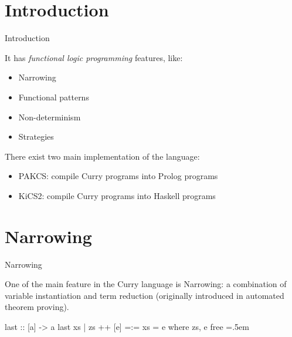 \documentclass{beamer}
\newenvironment{cverbatim}
 {\SaveVerbatim{cverb}}
 {\endSaveVerbatim
  \flushleft\fboxrule=0pt\fboxsep=.5em
  \colorbox{cverbbg}{\BUseVerbatim{cverb}}%
  \endflushleft
}
\begin{document}
\section{Introduction}
\begin{frame}{Introduction}

It has \emph{functional logic programming} features, like:

\vspace{1em}

\begin{itemize}
  \item Narrowing
  \item Functional patterns
  \item Non-determinism
  \item Strategies
\end{itemize}

\vspace{1em}

There exist two main implementation of the language:

\vspace{1em}

\begin{itemize}
  \item PAKCS: compile Curry programs into Prolog programs
  \item KiCS2: compile Curry programs into Haskell programs
\end{itemize}

\end{frame}


\section{Narrowing}
\begin{frame}[fragile]{Narrowing}

One of the main feature in the Curry language is Narrowing: a combination of variable instantiation and term reduction (originally introduced in automated theorem proving).

\begin{cverbatim}
last :: [a] -> a
last xs | zs ++ [e] =:= xs   =   e
  where zs, e free
\end{cverbatim}

\end{frame}

\end{document}
